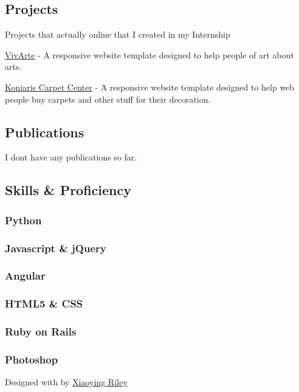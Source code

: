 \documentclass[
]{article}
\begin{document}
\hypertarget{projects}{%
\subsection{\texorpdfstring{{ \emph{} \emph{} }
Projects}{    Projects}}\label{projects}}

Projects that actually online that I created in my Internship

{ \href{https://www.vivarte.gr/}{VivArte} } - {A responsive website
template designed to help people of art about arts.}

{ \href{https://e-moketes.gr/}{Koniaris Carpet Center} } - {A responsive
website template designed to help web people buy carpets and other stuff
for their decoration.}

\hypertarget{publications}{%
\subsection{\texorpdfstring{{ \emph{} \emph{} }
Publications}{    Publications}}\label{publications}}

I dont have any publications so far.

\hypertarget{skills-proficiency}{%
\subsection{\texorpdfstring{{ \emph{} \emph{} } Skills \&
Proficiency}{    Skills \& Proficiency}}\label{skills-proficiency}}

\hypertarget{python}{%
\subsubsection{Python}\label{python}}

\hypertarget{javascript-jquery}{%
\subsubsection{Javascript \& jQuery}\label{javascript-jquery}}

\hypertarget{angular}{%
\subsubsection{Angular}\label{angular}}

\hypertarget{html5-css}{%
\subsubsection{HTML5 \& CSS}\label{html5-css}}

\hypertarget{ruby-on-rails}{%
\subsubsection{Ruby on Rails}\label{ruby-on-rails}}

\hypertarget{photoshop}{%
\subsubsection{Photoshop}\label{photoshop}}

{Designed with \emph{} by \href{http://themes.3rdwavemedia.com}{Xiaoying
Riley}}
\end{document}
